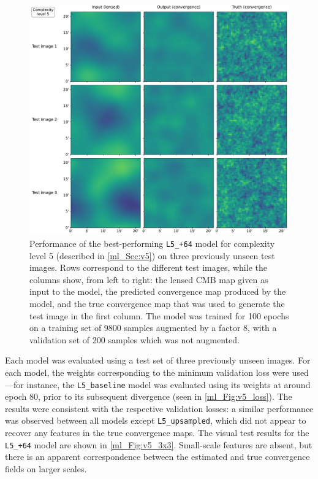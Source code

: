 \begin{figure}[tp]
\includegraphics[width=\textwidth]{v5_3x3}
\caption{Performance of the best-performing \texttt{L5\_+64} model for complexity level 5 (described in \autoref{ml_Sec:v5}) on three previously unseen test images. Rows correspond to the different test images, while the columns show, from left to right: the lensed CMB map given as input to the model, the predicted convergence map produced by the model, and the true convergence map that was used to generate the test image in the first column. The model was trained for 100 epochs on a training set of 9800 samples augmented by a factor 8, with a validation set of 200 samples which was not augmented.}
\label{ml_Fig:v5_3x3}
\end{figure}

Each model was evaluated using a test set of three previously unseen images. For each model, the weights corresponding to the minimum validation loss were used---for instance, the \texttt{L5\_baseline} model was evaluated using its weights at around epoch 80, prior to its subsequent divergence (seen in \autoref{ml_Fig:v5_loss}). The results were consistent with the respective validation losses: a similar performance was observed between all models except \texttt{L5\_upsampled}, which did not appear to recover any features in the true convergence maps. The visual test results for the \texttt{L5\_+64} model are shown in \autoref{ml_Fig:v5_3x3}. Small-scale features are absent, but there is an apparent correspondence between the estimated and true convergence fields on larger scales.

